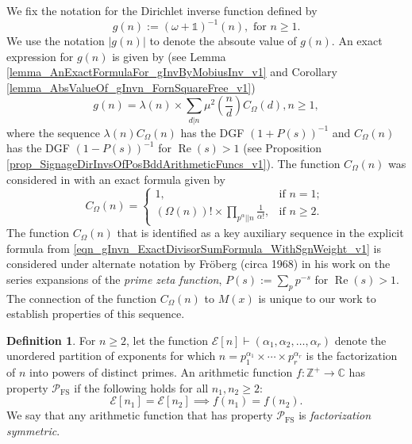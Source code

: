 \documentclass[11pt,reqno,a4letter]{article}
\newcommand{\hlocalref}[1]{\hyperref[#1]{\ref{#1}}}
\numberwithin{equation}{section}
\numberwithin{figure}{section}
\numberwithin{table}{section}
\newcommand{\cf}{\textit{cf.\ }}
\newcommand{\seqnum}[1]{\href{http://oeis.org/#1}{\color{ProcessBlue}{\underline{#1}}}}
\theoremstyle{plain}
\numberwithin{theorem}{section}
\theoremstyle{definition}
\newtheorem{definition}[theorem]{Definition}
\renewcommand{\Re}{\operatorname{Re}}
\begin{document}
We fix the notation for the Dirichlet inverse function defined by \cite[\seqnum{A341444}]{OEIS} 
\begin{equation}
\label{eqn_gInvn_def_v1}
g(n) := (\omega + \mathds{1})^{-1}(n), \text{ for } n \geq 1. 
\end{equation}
We use the notation $|g(n)|$ to denote the absoute value of $g(n)$. 
An exact expression for $g(n)$ is given by 
(see Lemma \hlocalref{lemma_AnExactFormulaFor_gInvByMobiusInv_v1} and 
Corollary \hlocalref{lemma_AbsValueOf_gInvn_FornSquareFree_v1}) 
\begin{equation}
\label{eqn_gInvn_ExactDivisorSumFormula_WithSgnWeight_v1} 
g(n) = \lambda(n) \times \sum_{d|n} \mu^2\left(\frac{n}{d}\right) C_{\Omega}(d), n \geq 1,  
\end{equation}
where the sequence $\lambda(n) C_{\Omega}(n)$ has the DGF $(1 + P(s))^{-1}$ and 
$C_{\Omega}(n)$ has the DGF $(1-P(s))^{-1}$ for $\Re(s) > 1$ 
(see Proposition \hlocalref{prop_SignageDirInvsOfPosBddArithmeticFuncs_v1}). 
The function $C_{\Omega}(n)$ was considered in 
\cite{FROBERG-1968} with an exact formula 
given by \cite[\cf \S 3]{CLT-RANDOM-ORDERED-FACTS-2011} 
\begin{equation}
\label{eqn_proof_tag_hInvn_ExactNestedSumFormula_CombInterpetIdent_v3}
C_{\Omega}(n) = \begin{cases}
     1, & \text{if $n = 1$; } \\ 
     (\Omega(n))! \times \prod\limits_{p^{\alpha}||n} \frac{1}{\alpha!}, & \text{if $n \geq 2$. }
     \end{cases}
\end{equation} 
The function $C_{\Omega}(n)$ that is identified as a key auxiliary sequence 
in the explicit formula from 
\eqref{eqn_gInvn_ExactDivisorSumFormula_WithSgnWeight_v1} 
is considered under alternate notation 
by Fr\"oberg (circa 1968) in his work on the series expansions of the 
\emph{prime zeta function}, $P(s) := \sum_p p^{-s}$ for $\Re(s) > 1$. 
The connection of the function $C_{\Omega}(n)$ to $M(x)$ 
is unique to our work to establish properties of this sequence.

\begin{definition}
\label{def_ExponentiallyDistinctArithFuncs_Intro_v1} 
For $n \geq 2$, let the function 
$\mathcal{E}[n] \vdash (\alpha_1, \alpha_2, \ldots, \alpha_r)$ denote the unordered 
partition of exponents for which 
$n = p_1^{\alpha_1} \times \cdots \times p_r^{\alpha_r}$ is the factorization of 
$n$ into powers of distinct primes. 
An arithmetic function $f: \mathbb{Z}^{+} \rightarrow \mathbb{C}$ has 
property $\mathcal{P}_{\operatorname{FS}}$ if the following holds 
for all $n_1, n_2 \geq 2$: 
\[
\mathcal{E}[n_1] = \mathcal{E}[n_2] \implies f(n_1) = f(n_2). 
\]
We say that any arithmetic function that has property $\mathcal{P}_{\operatorname{FS}}$ 
is \emph{factorization symmetric}. 
\end{definition}
\end{document}
